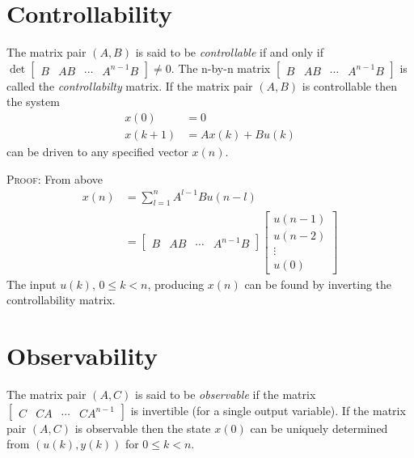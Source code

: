 \documentclass[a4paper,twoside,10pt,english]{report}
\begin{document}
\section{Controllability}
The matrix pair $\left(A,B\right)$ is said to be \emph{controllable}
if and only if $\det\left[\begin{array}{cccc}
B & AB & \cdots & A^{n-1}B\end{array}\right]\neq0$. The n-by-n matrix
$\left[\begin{array}{cccc} B & AB & \cdots & A^{n-1}B\end{array}\right]$ is
 called the \emph{controllabilty} matrix. If the matrix pair $ (A,B) $
is controllable then the system
\begin{align*}
x\left(0\right) &= 0\\
x\left(k+1\right) &= Ax\left(k\right)+Bu\left(k\right)
\end{align*}
can be driven to any specified vector $x\left(n\right)$.

\textsc{Proof}: From above
\begin{align*}
x\left(n\right) &= \sum_{l=1}^{n}A^{l-1}Bu\left(n-l\right)\\
 &= \left[\begin{array}{cccc}
B & AB & \cdots & A^{n-1}B\end{array}\right]\left[\begin{array}{c}
u\left(n-1\right)\\
u\left(n-2\right)\\
\vdots\\
u\left(0\right)
\end{array}\right]
\end{align*}
The input $u\left(k\right)$, $0\leq k<n$, producing $x\left(n\right)$
can be found by inverting the controllability matrix.

\section{Observability}
The matrix pair $\left(A,C\right)$ is said to be \emph{observable}
if the matrix $\left[\begin{array}{cccc}
C & CA & \cdots & CA^{n-1}\end{array}\right]$ is invertible (for a single output variable). If the matrix pair
$\left(A,C\right)$ is observable then the state $x\left(0\right)$
can be uniquely determined from $\left(u\left(k\right),y\left(k\right)\right)$
for $0\leq{} k<n$.
\end{document}
